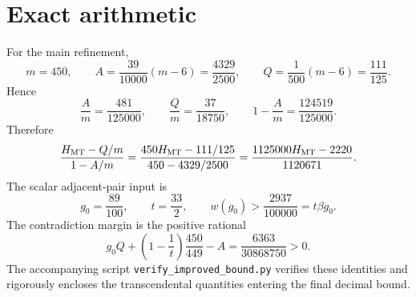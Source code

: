 \section{Exact arithmetic}

For the main refinement,
\[
 m=450,\qquad
 A=\frac{39}{10000}(m-6)=\frac{4329}{2500},\qquad
 Q=\frac1{500}(m-6)=\frac{111}{125}.
\]
Hence
\[
 \frac{A}{m}=\frac{481}{125000},\qquad
 \frac{Q}{m}=\frac{37}{18750},\qquad
 1-\frac{A}{m}=\frac{124519}{125000}.
\]
Therefore
\[
 \frac{H_{\rm MT}-Q/m}{1-A/m}
 =
 \frac{450H_{\rm MT}-111/125}{450-4329/2500}
 =
 \frac{1125000H_{\rm MT}-2220}{1120671}.
\]
The scalar adjacent-pair input is
\[
 g_0=\frac{89}{100},\qquad t=\frac{33}{2},
 \qquad
 w(g_0)>\frac{2937}{100000}=t\beta g_0.
\]
The contradiction margin is the positive rational
\[
 g_0Q+\left(1-\frac1t\right)\frac{450}{449}-A
 =
 \frac{6363}{30868750}>0.
\]
The accompanying script \texttt{verify\_improved\_bound.py} verifies these
identities and rigorously encloses the transcendental quantities entering the
final decimal bound.
